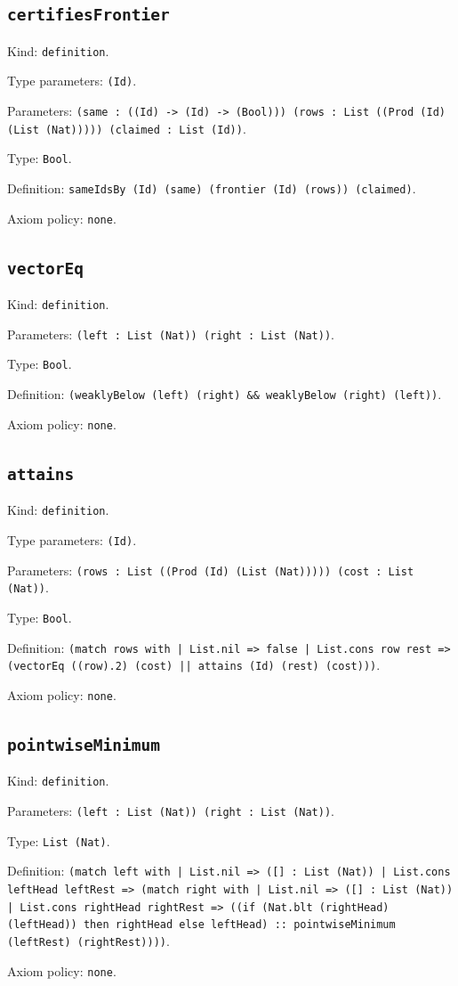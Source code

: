 \documentclass[11pt]{article}
\begin{document}
\subsection*{\texttt{certifiesFrontier}}
\noindent Kind: \texttt{definition}.\par
\noindent Type parameters: \texttt{(Id)}.\par
\noindent Parameters: \texttt{(same : ((Id) -> (Id) -> (Bool))) (rows : List ((Prod (Id) (List (Nat))))) (claimed : List (Id))}.\par
\noindent Type: \texttt{Bool}.\par
\noindent Definition: \texttt{sameIdsBy (Id) (same) (frontier (Id) (rows)) (claimed)}.\par
\noindent Axiom policy: \texttt{none}.\par
\subsection*{\texttt{vectorEq}}
\noindent Kind: \texttt{definition}.\par
\noindent Parameters: \texttt{(left : List (Nat)) (right : List (Nat))}.\par
\noindent Type: \texttt{Bool}.\par
\noindent Definition: \texttt{(weaklyBelow (left) (right) \&\& weaklyBelow (right) (left))}.\par
\noindent Axiom policy: \texttt{none}.\par
\subsection*{\texttt{attains}}
\noindent Kind: \texttt{definition}.\par
\noindent Type parameters: \texttt{(Id)}.\par
\noindent Parameters: \texttt{(rows : List ((Prod (Id) (List (Nat))))) (cost : List (Nat))}.\par
\noindent Type: \texttt{Bool}.\par
\noindent Definition: \texttt{(match rows with | List.nil => false | List.cons row rest => (vectorEq ((row).2) (cost) || attains (Id) (rest) (cost)))}.\par
\noindent Axiom policy: \texttt{none}.\par
\subsection*{\texttt{pointwiseMinimum}}
\noindent Kind: \texttt{definition}.\par
\noindent Parameters: \texttt{(left : List (Nat)) (right : List (Nat))}.\par
\noindent Type: \texttt{List (Nat)}.\par
\noindent Definition: \texttt{(match left with | List.nil => ([] : List (Nat)) | List.cons leftHead leftRest => (match right with | List.nil => ([] : List (Nat)) | List.cons rightHead rightRest => ((if (Nat.blt (rightHead) (leftHead)) then rightHead else leftHead) :: pointwiseMinimum (leftRest) (rightRest))))}.\par
\noindent Axiom policy: \texttt{none}.\par
\end{document}
